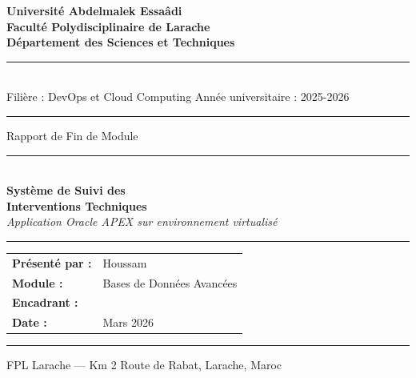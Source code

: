 \documentclass[12pt,a4paper,oneside]{report}
\begin{document}


\begin{titlepage}
  \centering
  \vspace*{0.3cm}

  {\large\bfseries Université Abdelmalek Essaâdi\\[4pt]
   Faculté Polydisciplinaire de Larache\\[4pt]
   Département des Sciences et Techniques}\\[0.6cm]

  \rule{\linewidth}{1.5pt}\\[0.3cm]
  {\small Filière : DevOps et Cloud Computing \hfill Année universitaire : 2025-2026}\\[0.3cm]
  \rule{\linewidth}{1pt}

  \vspace{1.2cm}
  {\large Rapport de Fin de Module}\\[0.4cm]
  \rule{0.5\linewidth}{0.8pt}\\[0.6cm]

  {\Huge\bfseries\color{bleuFPL}
    Système de Suivi des\\[6pt]
    Interventions Techniques}\\[0.5cm]
  {\large\itshape Application Oracle APEX sur environnement virtualisé}

  \vspace{0.8cm}
  \rule{0.5\linewidth}{0.8pt}

  \vspace{1cm}
  \begin{tabular}{ll}
    \textbf{Présenté par :}   & Houssam \\[4pt]
    \textbf{Module :}         & Bases de Données Avancées \\[4pt]
    \textbf{Encadrant :}      & \dotfill \\[4pt]
    \textbf{Date :}           & Mars 2026 \\
  \end{tabular}

  \vfill
  \rule{\linewidth}{1.5pt}
  {\footnotesize FPL Larache — Km 2 Route de Rabat, Larache, Maroc}
\end{titlepage}
\end{document}
